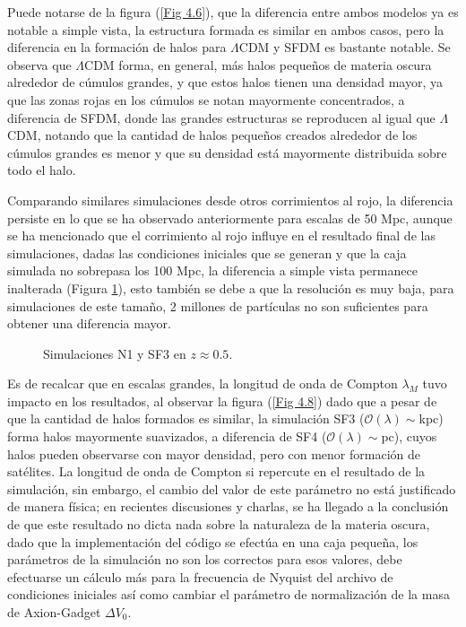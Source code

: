 \documentclass[a4paper,openright,10pt, oneside, final]{book}
\begin{document}
Puede notarse de la figura (\ref{Fig 4.6}), que la diferencia entre ambos modelos ya es notable a simple vista, la estructura formada es similar en ambos casos, pero la diferencia en la formación de halos para $\Lambda$CDM y SFDM es bastante notable. Se observa que $\Lambda$CDM forma, en general, más halos pequeños de materia oscura alrededor de cúmulos grandes, y que estos halos tienen una densidad mayor, ya que las zonas rojas en los cúmulos se notan mayormente concentrados, a diferencia de SFDM, donde las grandes estructuras se reproducen al igual que $\Lambda$CDM, notando que la cantidad de halos pequeños creados alrededor de los cúmulos grandes es menor y que su densidad está mayormente distribuida sobre todo el halo.

Comparando similares simulaciones desde otros corrimientos al rojo, la diferencia persiste en lo que se ha observado anteriormente para escalas de 50 Mpc, aunque se ha mencionado que el corrimiento al rojo influye en el resultado final de las simulaciones, dadas las condiciones iniciales que se generan y que la caja simulada no sobrepasa los 100 Mpc, la diferencia a simple vista permanece inalterada (Figura \ref{Fig 4.7}), esto también se debe a que la resolución es muy baja, para simulaciones de este tamaño, 2 millones de partículas no son suficientes para obtener una diferencia mayor.

\begin{figure}
\centering
{}
\caption{\footnotesize{Simulaciones N1 y SF3 en $z\approx0.5$.}}\label{Fig 4.7}
\end{figure}
Es de recalcar que en escalas grandes, la longitud de onda de Compton $\lambda_{M}$ tuvo impacto en los resultados, al observar la figura (\ref{Fig 4.8}) dado que a pesar de que la cantidad de halos formados es similar, la simulación SF3 ($\mathcal{O}(\lambda)\sim$kpc) forma halos mayormente suavizados, a diferencia de SF4 ($\mathcal{O}(\lambda)\sim$pc), cuyos halos pueden observarse con mayor densidad, pero con menor formación de satélites. La longitud de onda de Compton si repercute en el resultado de la simulación, sin embargo, el cambio del valor de este parámetro no está justificado de manera física; en recientes discusiones y charlas, se ha llegado a la conclusión de que este resultado no dicta nada sobre la naturaleza de la materia oscura, dado que la implementación del código se efectúa en una caja pequeña, los parámetros de la simulación no son los correctos para esos valores, debe efectuarse un cálculo más para la frecuencia de Nyquist del archivo de condiciones iniciales así como cambiar el parámetro de normalización de la masa de Axion-Gadget $\Delta V_{0}$.
\end{document}
